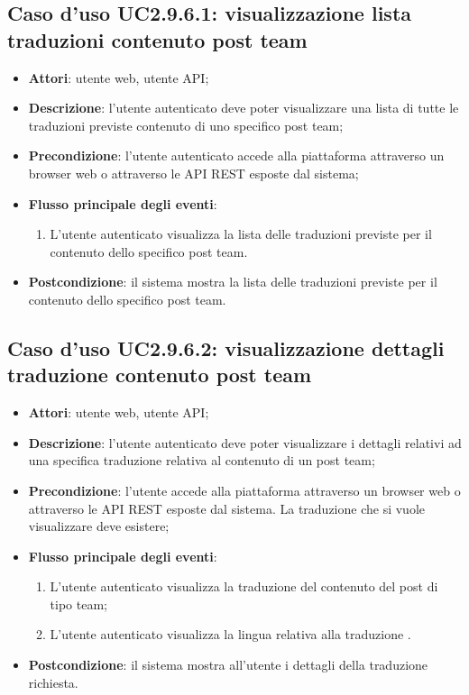 \hypertarget{UC2.9.6.1}{}
\subsection{Caso d'uso UC2.9.6.1: visualizzazione lista traduzioni contenuto post team}
\begin{itemize}
\item \textbf{Attori}: utente web, utente API;
\item \textbf{Descrizione}: l'utente autenticato deve poter visualizzare una lista di tutte le traduzioni previste contenuto di uno specifico post team; 
      \item \textbf{Precondizione}: l'utente autenticato accede alla piattaforma attraverso un browser web o attraverso le API REST esposte dal sistema;

        \item \textbf{Flusso principale degli eventi}:
          \begin{enumerate}
          \item L'utente autenticato visualizza la lista delle traduzioni previste per il contenuto dello specifico post team.

      \end{enumerate}
    \item \textbf{Postcondizione}: il sistema mostra la lista delle traduzioni previste per il contenuto dello specifico post team.
  \end{itemize}
\hypertarget{UC2.9.6.2}{}
\subsection{Caso d'uso UC2.9.6.2: visualizzazione dettagli traduzione contenuto post team}
\begin{itemize}
\item \textbf{Attori}: utente web, utente API;
\item \textbf{Descrizione}: l'utente autenticato deve poter visualizzare i dettagli relativi ad una specifica traduzione relativa al contenuto di un post team; 
      \item \textbf{Precondizione}: l'utente accede alla piattaforma attraverso un browser web o attraverso le API REST esposte dal sistema. La traduzione che si vuole visualizzare deve esistere;

        \item \textbf{Flusso principale degli eventi}:
          \begin{enumerate}
          \item L'utente autenticato visualizza la traduzione del contenuto del post di tipo team;
          \item L'utente autenticato visualizza la lingua relativa alla traduzione	.

      \end{enumerate}
    \item \textbf{Postcondizione}: il sistema mostra all'utente i dettagli della traduzione richiesta.
  \end{itemize}
\hypertarget{UC2.9.6.3}{}
